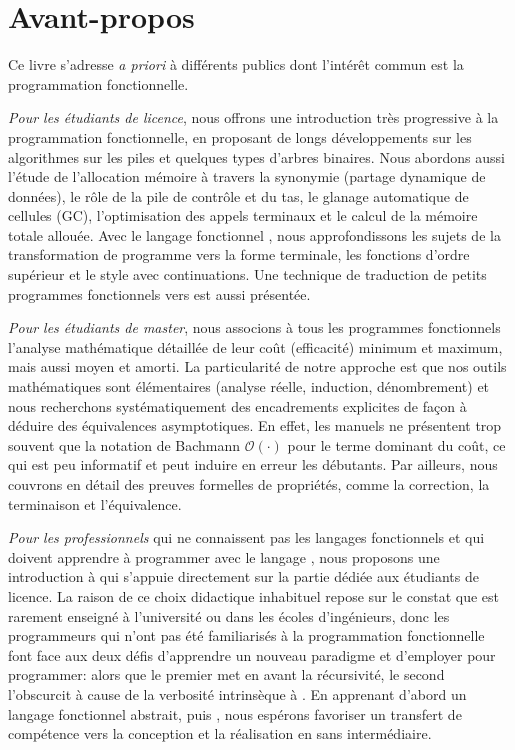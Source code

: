
\chapter*{Avant-propos}
\thispagestyle{empty}

Ce livre s'adresse \emph{a priori} à différents publics dont l'intérêt
commun est la programmation fonctionnelle.

\emph{Pour les étudiants de licence}, nous offrons une introduction très progressive à la programmation fonctionnelle, en proposant de longs développements sur les algorithmes sur les piles et quelques types d'arbres binaires. Nous abordons aussi l'étude de l'allocation mémoire à travers la synonymie (partage dynamique de données), le rôle de la pile de contrôle et du tas, le glanage automatique de cellules (GC), l'optimisation des appels terminaux et le calcul de la mémoire totale allouée. Avec le langage fonctionnel \Erlang, nous approfondissons les sujets de la transformation de programme vers la forme terminale, les fonctions d'ordre supérieur et le style avec continuations. Une technique de traduction de petits programmes fonctionnels vers \Java est aussi présentée.

\emph{Pour les étudiants de master}, nous associons à tous les programmes fonctionnels l'analyse mathématique détaillée de leur coût (efficacité) minimum et maximum, mais aussi moyen et amorti. La particularité de notre approche est que nos outils mathématiques sont élémentaires (analyse réelle, induction, dénombrement) et nous recherchons systématiquement des encadrements explicites de façon à déduire des équivalences asymptotiques. En effet, les manuels ne présentent trop souvent que la notation de Bachmann \(\mathcal{O}(\cdot)\) pour le terme dominant du coût, ce qui est peu informatif et peut induire en erreur les débutants. Par ailleurs, nous couvrons en détail des preuves formelles de propriétés, comme la correction, la terminaison et l'équivalence.

\emph{Pour les professionnels} qui ne connaissent pas les langages fonctionnels et qui doivent apprendre à programmer avec le langage \XSLT, nous proposons une introduction à \XSLT qui s'appuie directement sur la partie dédiée aux étudiants de licence. La raison de ce choix didactique inhabituel repose sur le constat que \XSLT est rarement enseigné à l'université ou dans les écoles d'ingénieurs, donc les programmeurs qui n'ont pas été familiarisés à la programmation fonctionnelle font face aux deux défis d'apprendre un nouveau paradigme et d'employer \XML pour programmer: alors que le premier met en avant la récursivité, le second l'obscurcit à cause de la verbosité intrinsèque à \XML. En apprenant d'abord un langage fonctionnel abstrait, puis \XML, nous espérons favoriser un transfert de compétence vers la conception et la réalisation en \XSLT sans intermédiaire.

